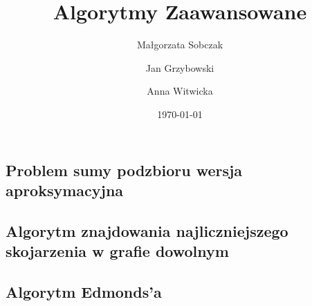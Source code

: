 \documentclass[11pt,a4paper]{article}
\begin{document}
                  

\title{Algorytmy Zaawansowane}
\author{Małgorzata Sobczak \and Jan Grzybowski \and Anna Witwicka}
\date{\today}

\maketitle 
                
\clearpage

\tableofcontents
\clearpage






















\subsection{Problem sumy podzbioru wersja aproksymacyjna}


\subsection{Algorytm znajdowania najliczniejszego skojarzenia w grafie dowolnym}


\subsection{Algorytm Edmonds'a}

\end{document}
